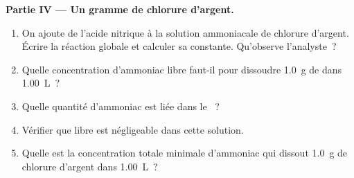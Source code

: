 \begin{problem}
\medskip
\noindent\textbf{Partie IV --- Un gramme de chlorure d'argent.}
\begin{enumerate}[resume]
  \item On ajoute de l'acide nitrique à la solution ammoniacale de
        chlorure d'argent. Écrire la réaction globale et calculer sa
        constante. Qu'observe l'analyste~?
  \item Quelle concentration d'ammoniac libre faut-il pour dissoudre
        \qty{1.0}{g} de  dans \qty{1.00}{L}~?
  \item Quelle quantité d'ammoniac est liée dans le ~?
  \item Vérifier que  libre est négligeable dans cette solution.
  \item Quelle est la concentration totale minimale d'ammoniac qui
        dissout \qty{1.0}{g} de chlorure d'argent dans \qty{1.00}{L}~?
\end{enumerate}
\end{problem}
